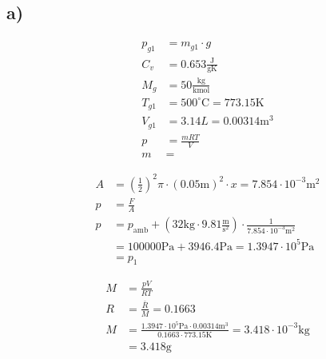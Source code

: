 

\subsection*{a)}

\begin{align*}
p_{g1} &= m_{g1} \cdot g \\
C_v &= 0.653 \frac{\text{J}}{\text{gK}} \\
M_g &= 50 \frac{\text{kg}}{\text{kmol}} \\
T_{g1} &= 500^\circ \text{C} = 773.15 \text{K} \\
V_{g1} &= 3.14 L = 0.00314 \text{m}^3 \\
p &= \frac{mRT}{V} \\
m &= 
\end{align*}

\begin{align*}
A &= \left( \frac{1}{2} \right)^2 \pi \cdot (0.05 \text{m})^2 \cdot x = 7.854 \cdot 10^{-3} \text{m}^2 \\
p &= \frac{F}{A} \\
p &= p_{\text{amb}} + \left( 32 \text{kg} \cdot 9.81 \frac{\text{m}}{\text{s}^2} \right) \cdot \frac{1}{7.854 \cdot 10^{-3} \text{m}^2} \\
&= 100000 \text{Pa} + 3946.4 \text{Pa} = 1.3947 \cdot 10^5 \text{Pa} \\
&= p_1
\end{align*}

\begin{align*}
M &= \frac{pV}{RT} \\
R &= \frac{\bar{R}}{M} = 0.1663 \\
M &= \frac{1.3947 \cdot 10^5 \text{Pa} \cdot 0.00314 \text{m}^3}{0.1663 \cdot 773.15 \text{K}} = 3.418 \cdot 10^{-3} \text{kg} \\
&= 3.418 \text{g}
\end{align*}